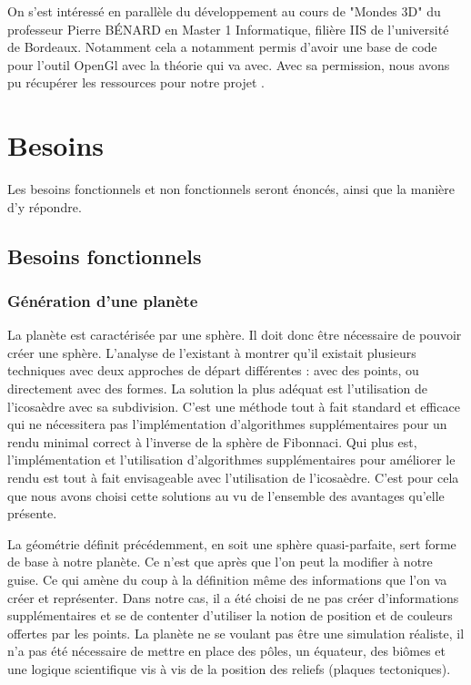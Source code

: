 \documentclass[a4paper]{article}
\begin{document}
    On s'est intéressé en parallèle du développement au cours de "Mondes 3D" du professeur Pierre BÉNARD en Master 1 Informatique, filière IIS de l'université de Bordeaux. Notamment cela a notamment permis d'avoir une base de code pour l'outil OpenGl avec la théorie qui va avec. Avec sa permission, nous avons pu récupérer les ressources pour notre projet \cite{TD_3D}.

\newpage 
\section{Besoins}

Les besoins fonctionnels et non fonctionnels seront énoncés, ainsi que la manière d'y répondre.

\subsection{Besoins fonctionnels}

\subsubsection{Génération d'une planète}

\label{geo_planet}
La planète est caractérisée par une sphère. Il doit donc être nécessaire de pouvoir créer une sphère. L’analyse de l’existant à montrer qu’il existait plusieurs techniques avec deux approches de départ différentes : avec des points, ou directement avec des formes.  La solution la plus adéquat est l’utilisation de l’icosaèdre avec sa subdivision. C’est une méthode tout à fait standard et efficace qui ne nécessitera pas l’implémentation d’algorithmes supplémentaires pour un rendu minimal correct à l’inverse de la sphère de Fibonnaci. Qui plus est, l’implémentation et l’utilisation d’algorithmes supplémentaires pour améliorer le rendu est tout à fait envisageable avec l’utilisation de l’icosaèdre. C'est pour cela que nous avons choisi cette solutions au vu de l'ensemble des avantages qu'elle présente.

La géométrie définit précédemment, en soit une sphère quasi-parfaite, sert forme de base à notre planète. Ce n’est que après que l'on peut la modifier à notre guise. Ce qui amène du coup à la définition même des informations que l’on va créer et représenter. Dans notre cas, il a été choisi de ne pas créer d'informations supplémentaires et se de contenter d'utiliser la notion de position et de couleurs offertes par les points. La planète ne se voulant pas être une simulation réaliste, il n'a pas été nécessaire de mettre en place des pôles, un équateur, des biômes et une logique scientifique vis à vis de la position des reliefs (plaques tectoniques). 
\end{document}
